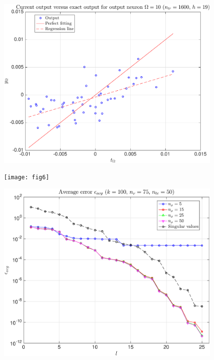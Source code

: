 \documentclass[11pt,a4paper]{article}
\theoremstyle{definition}
\theoremstyle{theorem}
\numberwithin{equation}{section}
\begin{document}
	\begin{figure}[H]
		\center
		\includegraphics[scale = 0.5]{fig5}
		\caption{}
	\end{figure}
	
	\begin{figure}[H]
		\center
		\texttt{[image: fig6]}
		\caption{}
	\end{figure}
	
	\begin{figure}[H]
		\center
		\includegraphics[scale = 0.5]{fig7}
		\caption{}
	\end{figure}
	
\end{document}
